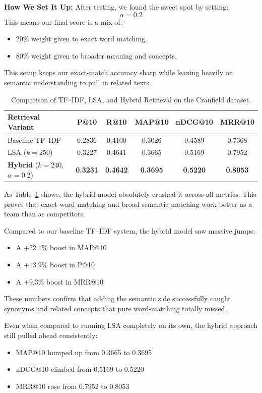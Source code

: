 \documentclass[runningheads]{llncs}
\begin{document}
\textbf{How We Set It Up:}
After testing, we found the sweet spot by setting:
\begin{equation}
\alpha = 0.2
\end{equation}
This means our final score is a mix of:
\begin{itemize}
    \item 20\% weight given to exact word matching.
    \item 80\% weight given to broader meaning and concepts.
\end{itemize}
This setup keeps our exact-match accuracy sharp while leaning heavily on semantic understanding to pull in related texts.

\begin{table}[htbp]
\centering
\caption{Comparison of TF--IDF, LSA, and Hybrid Retrieval on the Cranfield dataset.}
\label{tab:hybrid-comparison}
\begin{tabular}{l c c c c c}
\toprule
\textbf{Retrieval Variant} &
\textbf{P@10} &
\textbf{R@10} &
\textbf{MAP@10} &
\textbf{nDCG@10} &
\textbf{MRR@10} \\
\midrule
Baseline TF--IDF & 0.2836 & 0.4100 & 0.3026 & 0.4589 & 0.7368 \\
LSA ($k = 250$) & 0.3227 & 0.4641 & 0.3665 & 0.5169 & 0.7952 \\
\textbf{Hybrid} ($k = 240$, $\alpha = 0.2$)
& \textbf{0.3231}
& \textbf{0.4642}
& \textbf{0.3695}
& \textbf{0.5220}
& \textbf{0.8053} \\
\bottomrule
\end{tabular}
\end{table}

As Table~\ref{tab:hybrid-comparison} shows, the hybrid model absolutely crushed it across all metrics. This proves that exact-word matching and broad semantic matching work better as a team than as competitors.

Compared to our baseline TF--IDF system, the hybrid model saw massive jumps:
\begin{itemize}
    \item A $+22.1\%$ boost in MAP@10
    \item A $+13.9\%$ boost in P@10
    \item A $+9.3\%$ boost in MRR@10
\end{itemize}
These numbers confirm that adding the semantic side successfully caught synonyms and related concepts that pure word-matching totally missed.

Even when compared to running LSA completely on its own, the hybrid approach still pulled ahead consistently:
\begin{itemize}
    \item MAP@10 bumped up from 0.3665 to 0.3695
    \item nDCG@10 climbed from 0.5169 to 0.5220
    \item MRR@10 rose from 0.7952 to 0.8053
\end{itemize}
\end{document}
